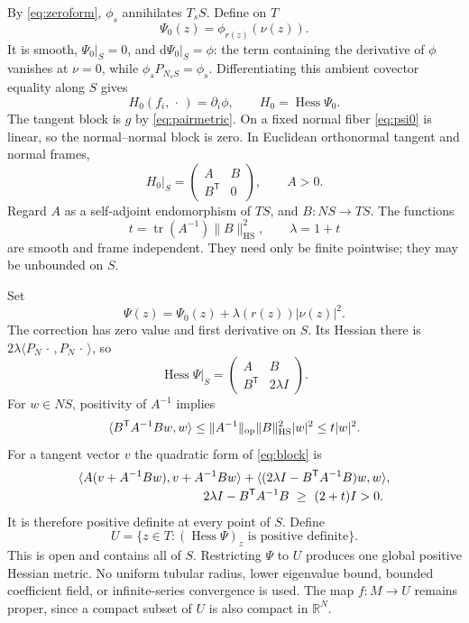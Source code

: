 \documentclass[10pt,letterpaper]{article}
\newcommand{\R}{\mathbb R}
\newcommand{\dd}{\mathrm d}
\newcommand{\Hess}{\operatorname{Hess}}
\newcommand{\tr}{\operatorname{tr}}
\newcommand{\HS}{\mathrm{HS}}
\begin{document}
By \eqref{eq:zeroform}, $\phi_s$ annihilates $T_sS$. Define on $T$
\begin{equation}\label{eq:psi0}
 \Psi_0(z)=\phi_{r(z)}(\nu(z)).
\end{equation}
It is smooth, $\Psi_0|_S=0$, and $\dd\Psi_0|_S=\phi$: the term
containing the derivative of $\phi$ vanishes at $\nu=0$, while
$\phi_s P_{N_sS}=\phi_s$. Differentiating this ambient covector equality
along $S$ gives
\begin{equation}\label{eq:hessian-column}
 H_0(f_i,\,\cdot\,)=\partial_i\phi,
 \qquad H_0=\Hess\Psi_0.
\end{equation}
The tangent block is $g$ by \eqref{eq:pairmetric}. On a fixed normal fiber
\eqref{eq:psi0} is linear, so the normal--normal block is zero. In Euclidean
orthonormal tangent and normal frames,
\[
 H_0|_S=\begin{pmatrix}A&B\\B^{\mathsf T}&0\end{pmatrix},\qquad A>0.
\]
Regard $A$ as a self-adjoint endomorphism of $TS$, and $B:NS\to TS$.
The functions
\begin{equation}\label{eq:lambda}
 t=\tr(A^{-1})\|B\|_{\HS}^2,\qquad \lambda=1+t
\end{equation}
are smooth and frame independent. They need only be finite pointwise;
they may be unbounded on $S$.

Set
\begin{equation}\label{eq:psi}
 \Psi(z)=\Psi_0(z)+\lambda(r(z))|\nu(z)|^2.
\end{equation}
The correction has zero value and first derivative on $S$. Its Hessian
there is $2\lambda\langle P_N\,\cdot\,,P_N\,\cdot\,\rangle$, so
\begin{equation}\label{eq:block}
 \Hess\Psi|_S=\begin{pmatrix}A&B\\B^{\mathsf T}&2\lambda I\end{pmatrix}.
\end{equation}
For $w\in NS$, positivity of $A^{-1}$ implies
\[
 \langle B^{\mathsf T}A^{-1}Bw,w\rangle
 \leq \|A^{-1}\|_{\rm op}\|B\|_{\HS}^2|w|^2
 \leq t|w|^2.
\]
For a tangent vector $v$ the quadratic form of \eqref{eq:block} is
\begin{align*}
 &\langle A(v+A^{-1}Bw),v+A^{-1}Bw\rangle
       +\langle(2\lambda I-B^{\mathsf T}A^{-1}B)w,w\rangle,\\[-2pt]
 &\hspace{35mm}2\lambda I-B^{\mathsf T}A^{-1}B\ \geq\ (2+t)I>0.
\end{align*}
It is therefore positive definite at every point of $S$. Define
\begin{equation}\label{eq:U}
 U=\{z\in T:(\Hess\Psi)_z\text{ is positive definite}\}.
\end{equation}
This is open and contains all of $S$. Restricting $\Psi$ to $U$ produces
one global positive Hessian metric. No uniform tubular radius, lower
eigenvalue bound, bounded coefficient field, or infinite-series convergence
is used. The map $f:M\to U$ remains proper, since a compact subset of $U$
is also compact in $\R^N$.
\end{document}

